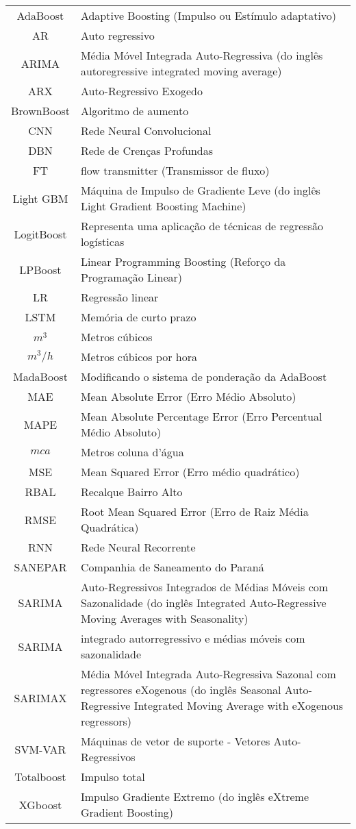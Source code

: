 \begin{tabular}{cp{}}
	AdaBoost & Adaptive Boosting (Impulso ou Estímulo adaptativo)\\
	AR & Auto regressivo\\
	ARIMA & Média Móvel Integrada Auto-Regressiva (do inglês autoregressive integrated moving average) \\
	ARX & Auto-Regressivo Exogedo\\ 
	BrownBoost & Algoritmo de aumento\\
	CNN & Rede Neural Convolucional\\
	DBN & Rede de Crenças Profundas \\
	FT & flow transmitter (Transmissor de fluxo)\\
	Light GBM & Máquina de Impulso de Gradiente Leve (do inglês Light Gradient Boosting Machine) \\
	LogitBoost & Representa uma aplicação de técnicas de regressão logísticas\\
	LPBoost & Linear Programming Boosting (Reforço da Programação Linear)\\
	LR & Regressão linear\\
	LSTM & Memória de curto prazo\\
	$ m^3 $ & Metros cúbicos\\
	$ m^3/h $ & Metros cúbicos por hora\\
	MadaBoost & Modificando o sistema de ponderação da AdaBoost\\
	MAE & Mean Absolute Error (Erro Médio Absoluto)\\
	MAPE &  Mean Absolute Percentage Error (Erro Percentual Médio Absoluto)\\
	$ mca $ & Metros coluna d’água\\
	MSE & Mean Squared Error (Erro médio quadrático)\\
	RBAL & Recalque Bairro Alto\\
	RMSE & Root Mean Squared Error (Erro de Raiz Média Quadrática)\\
	RNN & Rede Neural Recorrente\\
	SANEPAR & Companhia de Saneamento do Paraná \\
	SARIMA & Auto-Regressivos Integrados de Médias Móveis com Sazonalidade (do inglês Integrated Auto-Regressive Moving Averages with Seasonality) \\
	SARIMA & integrado autorregressivo e médias móveis com sazonalidade\\
	SARIMAX &  Média Móvel Integrada Auto-Regressiva Sazonal com regressores eXogenous (do inglês Seasonal Auto-Regressive Integrated Moving Average with eXogenous regressors) \\
	SVM-VAR & Máquinas de vetor de suporte - Vetores Auto-Regressivos\\
	Totalboost & Impulso total\\
	XGboost & Impulso Gradiente Extremo (do inglês eXtreme Gradient Boosting) 
\end{tabular}





